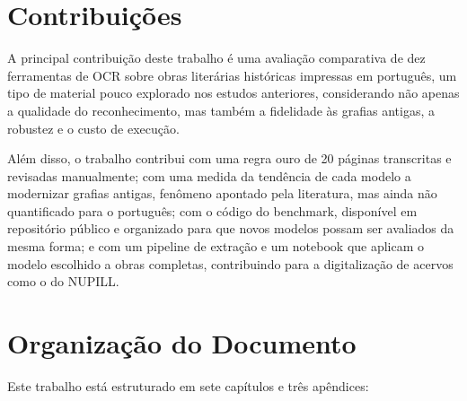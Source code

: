 \documentclass[noabntexcite,oneside]{ufsc-thesis-rn46-2019}
\begin{document}
\section{Contribuições}

A principal contribuição deste trabalho é uma avaliação comparativa de dez ferramentas
de OCR sobre obras literárias históricas impressas em português, um tipo de material pouco
explorado nos estudos anteriores, considerando não apenas a qualidade do reconhecimento,
mas também a fidelidade às grafias antigas, a robustez e o custo de execução.

Além disso, o trabalho contribui com uma regra ouro de 20 páginas transcritas e revisadas
manualmente; com uma medida da tendência de cada modelo a modernizar grafias antigas,
fenômeno apontado pela literatura, mas ainda não quantificado para o português; com o
código do benchmark, disponível em repositório público e organizado para que novos modelos
possam ser avaliados da mesma forma; e com um pipeline de extração e um notebook que
aplicam o modelo escolhido a obras completas, contribuindo para a digitalização de acervos
como o do NUPILL.

\section{Organização do Documento}

Este trabalho está estruturado em sete capítulos e três apêndices:
\end{document}
